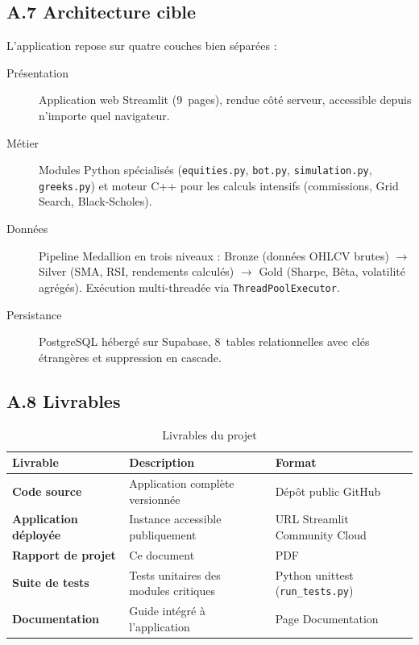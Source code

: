 \documentclass[a4paper, 12pt, twoside]{article}
\begin{document}
    \subsection*{A.7 Architecture cible}

    L'application repose sur quatre couches bien séparées :
    \begin{description}
        \item[Présentation] Application web Streamlit (9~pages), rendue
              côté serveur, accessible depuis n'importe quel navigateur.
        \item[Métier] Modules Python spécialisés (\texttt{equities.py},
              \texttt{bot.py}, \texttt{simulation.py}, \texttt{greeks.py})
              et moteur C++ pour les calculs intensifs (commissions, Grid
              Search, Black-Scholes).
        \item[Données] Pipeline Medallion en trois niveaux :
              Bronze (données OHLCV brutes) $\to$ Silver (SMA, RSI,
              rendements calculés) $\to$ Gold (Sharpe, Bêta, volatilité
              agrégés). Exécution multi-threadée via
              \texttt{ThreadPoolExecutor}.
        \item[Persistance] PostgreSQL hébergé sur Supabase, 8~tables
              relationnelles avec clés étrangères et suppression en cascade.
    \end{description}

    \subsection*{A.8 Livrables}

    \begin{table}[h]
    \centering
    \begin{tabular}{|>{\bfseries}l|l|l|}
    \hline
    Livrable & Description & Format \\
    \hline
    Code source & Application complète versionnée & Dépôt public GitHub \\
    Application déployée & Instance accessible publiquement
                         & URL Streamlit Community Cloud \\
    Rapport de projet & Ce document & PDF \\
    Suite de tests & Tests unitaires des modules critiques
                   & Python unittest (\texttt{run\_tests.py}) \\
    Documentation & Guide intégré à l'application & Page Documentation \\
    \hline
    \end{tabular}
    \caption{Livrables du projet}
    \end{table}
\end{document}
